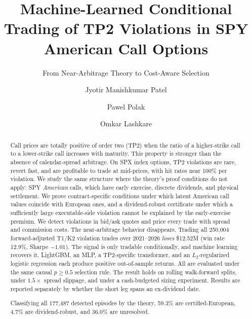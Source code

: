 \documentclass[sigconf,review]{acmart}
\begin{document}
\title{Machine-Learned Conditional Trading of TP2 Violations in SPY American Call Options}
\subtitle{From Near-Arbitrage Theory to Cost-Aware Selection}

\author{Jyotir Manishkumar Patel}

\author{Pawel Polak}

\author{Omkar Lashkare}

\renewcommand{\shortauthors}{Patel, Polak, Lashkare}

\begin{abstract}
Call prices are totally positive of order two (TP2) when the ratio of a higher-strike call to a lower-strike call increases with maturity. This property is stronger than the absence of calendar-spread arbitrage. On SPX index options, TP2 violations are rare, revert fast, and are profitable to trade at mid-prices, with hit rates near 100\% per violation. We study the same structure where the theory's proof conditions do not apply: SPY \emph{American} calls, which have early exercise, discrete dividends, and physical settlement. We prove contract-specific conditions under which latent American call values coincide with European ones, and a dividend-robust certificate under which a sufficiently large executable-side violation cannot be explained by the early-exercise premium. We detect violations in bid/ask quotes and price every trade with spread and commission costs. The near-arbitrage behavior disappears. Trading all 250{,}004 forward-adjusted T1/K2 violation trades over 2021--2026 \emph{loses} \$12.52M (win rate 12.9\%, Sharpe $-1.01$). The signal is only tradable conditionally, and machine learning recovers it. LightGBM, an MLP, a TP2-specific transformer, and an $L_2$-regularized logistic regression each produce positive out-of-sample returns. All are evaluated under the same causal $p\ge0.5$ selection rule. The result holds on rolling walk-forward splits, under $1.5\times$ spread slippage, and under a cash-budgeted sizing experiment. Results are reported separately by whether the short leg spans an ex-dividend date.

Classifying all 177{,}487 detected episodes by the theory, 59.3\% are certified-European, 4.7\% are dividend-robust, and 36.0\% are unresolved.
\end{abstract}
\end{document}

